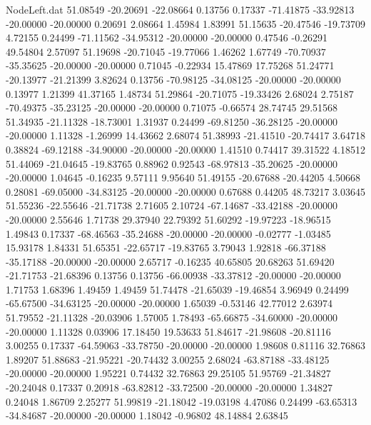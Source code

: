 \begin{filecontents}{NodeLeft.dat}
  51.08549  -20.20691  -22.08664     0.13756    0.17337  -71.41875  -33.92813  -20.00000  -20.00000    0.20691    2.08664    1.45984    1.83991
  51.15635  -20.47546  -19.73709     4.72155    0.24499  -71.11562  -34.95312  -20.00000  -20.00000    0.47546   -0.26291   49.54804    2.57097
  51.19698  -20.71045  -19.77066     1.46262    1.67749  -70.70937  -35.35625  -20.00000  -20.00000    0.71045   -0.22934   15.47869   17.75268
  51.24771  -20.13977  -21.21399     3.82624    0.13756  -70.98125  -34.08125  -20.00000  -20.00000    0.13977    1.21399   41.37165    1.48734
  51.29864  -20.71075  -19.33426     2.68024    2.75187  -70.49375  -35.23125  -20.00000  -20.00000    0.71075   -0.66574   28.74745   29.51568
  51.34935  -21.11328  -18.73001     1.31937    0.24499  -69.81250  -36.28125  -20.00000  -20.00000    1.11328   -1.26999   14.43662    2.68074
  51.38993  -21.41510  -20.74417     3.64718    0.38824  -69.12188  -34.90000  -20.00000  -20.00000    1.41510    0.74417   39.31522    4.18512
  51.44069  -21.04645  -19.83765     0.88962    0.92543  -68.97813  -35.20625  -20.00000  -20.00000    1.04645   -0.16235    9.57111    9.95640
  51.49155  -20.67688  -20.44205     4.50668    0.28081  -69.05000  -34.83125  -20.00000  -20.00000    0.67688    0.44205   48.73217    3.03645
  51.55236  -22.55646  -21.71738     2.71605    2.10724  -67.14687  -33.42188  -20.00000  -20.00000    2.55646    1.71738   29.37940   22.79392
  51.60292  -19.97223  -18.96515     1.49843    0.17337  -68.46563  -35.24688  -20.00000  -20.00000   -0.02777   -1.03485   15.93178    1.84331
  51.65351  -22.65717  -19.83765     3.79043    1.92818  -66.37188  -35.17188  -20.00000  -20.00000    2.65717   -0.16235   40.65805   20.68263
  51.69420  -21.71753  -21.68396     0.13756    0.13756  -66.00938  -33.37812  -20.00000  -20.00000    1.71753    1.68396    1.49459    1.49459
  51.74478  -21.65039  -19.46854     3.96949    0.24499  -65.67500  -34.63125  -20.00000  -20.00000    1.65039   -0.53146   42.77012    2.63974
  51.79552  -21.11328  -20.03906     1.57005    1.78493  -65.66875  -34.60000  -20.00000  -20.00000    1.11328    0.03906   17.18450   19.53633
  51.84617  -21.98608  -20.81116     3.00255    0.17337  -64.59063  -33.78750  -20.00000  -20.00000    1.98608    0.81116   32.76863    1.89207
  51.88683  -21.95221  -20.74432     3.00255    2.68024  -63.87188  -33.48125  -20.00000  -20.00000    1.95221    0.74432   32.76863   29.25105
  51.95769  -21.34827  -20.24048     0.17337    0.20918  -63.82812  -33.72500  -20.00000  -20.00000    1.34827    0.24048    1.86709    2.25277
  51.99819  -21.18042  -19.03198     4.47086    0.24499  -63.65313  -34.84687  -20.00000  -20.00000    1.18042   -0.96802   48.14884    2.63845

\end{filecontents}
